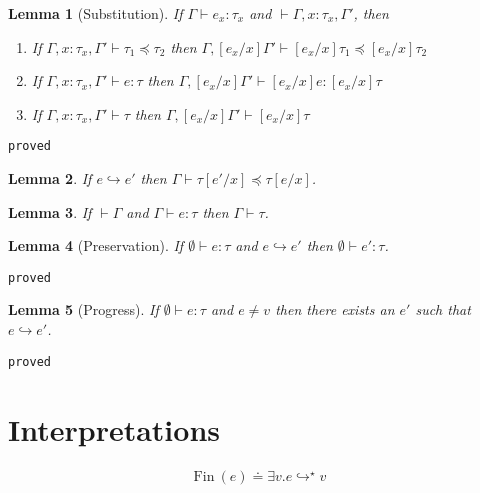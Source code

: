 \documentclass[10pt,a4paper]{article}
\newtheorem{lemma}{Lemma}
\newcommand\showproof[1]{\texttt{proved}}
\newcommand\fin[1]{\ensuremath{\text{Fin}\ (#1)}}
\newcommand\sub[2]{\ensuremath{\left[ #2 / #1 \right]}}
\newcommand\eval[2]{\ensuremath{#1 \hookrightarrow #2}}
\newcommand\evals[2]{\ensuremath{#1 \hookrightarrow^\star #2}}
\newcommand\hastype[3]{\ensuremath{#1 \vdash #2 \colon #3}}
\newcommand\iswellformed[2]{\ensuremath{#1 \vdash #2}}
\newcommand\issubtype[3]{\ensuremath{#1 \vdash #2 \preceq #3}}
\begin{document}
\begin{lemma}[Substitution]\label{lemma:substitution}
If \hastype{\Gamma}{e_x}{\tau_x} and \iswellformed{}{\Gamma, x\colon\tau_x ,\Gamma'}, then 
\begin{enumerate}
\item If 
	\issubtype{\Gamma, x\colon\tau_x, \Gamma'}{\tau_1}{\tau_2}
	then
	\issubtype{\Gamma, \sub{x}{e_x}\Gamma'}{\sub{x}{e_x}\tau_1}{\sub{x}{e_x}\tau_2}
\item If 
	\hastype{\Gamma, x\colon\tau_x, \Gamma'}{e}{\tau}
	then
	\hastype{\Gamma, \sub{x}{e_x}\Gamma'}{\sub{x}{e_x}e}{\sub{x}{e_x}\tau}
\item If 
	\iswellformed{\Gamma, x\colon\tau_x, \Gamma'}{\tau}
	then
	\iswellformed{\Gamma, \sub{x}{e_x}\Gamma'}{\sub{x}{e_x}\tau}
\end{enumerate}
\end{lemma}
\showproof{
	\begin{proof}
	
	\end{proof}
}
\begin{lemma}\label{lemma:eval}
If \eval{e}{e'} then \issubtype{\Gamma}{\tau\sub{x}{e'}}{\tau\sub{x}{e}}.
\end{lemma}

\begin{lemma}\label{lemma:wellformed}
If \iswellformed{}{\Gamma} and \hastype{\Gamma}{e}{\tau} then \iswellformed{\Gamma}{\tau}.
\end{lemma}


\begin{lemma}[Preservation]\label{lemma:preservation}
If \hastype{\emptyset}{e}{\tau} and \eval{e}{e'} then \hastype{\emptyset}{e'}{\tau}.
\end{lemma}
\showproof{
	\begin{proof}
	
	\end{proof}
}
\begin{lemma}[Progress]\label{lemma:progress}
If \hastype{\emptyset}{e}{\tau} and $e \neq v$ then there exists an $e'$ such that \eval{e}{e'}.
\end{lemma}
\showproof{
	\begin{proof}
	
	\end{proof}
}

\section*{Interpretations}
\begin{align*}
\fin{e} \doteq \exists v. \evals{e}{v}
\end{align*}
\end{document}
